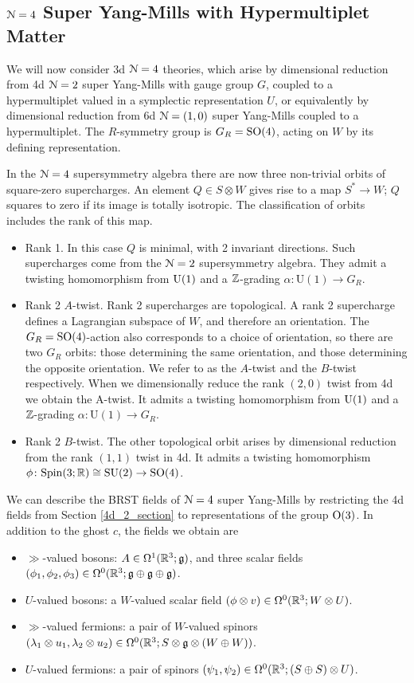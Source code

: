 \documentclass[10pt, oneside]{article}
\renewcommand{\U}{\mathrm{U}}
\begin{document}
\subsection{\texorpdfstring{$\mathcal N = 4$}{N=4} Super Yang-Mills with Hypermultiplet Matter} \label{3d_4_section}
We will now consider 3d $\mathcal{N}=4$ theories, which arise by dimensional reduction from 4d $\mathcal{N}=2$ super Yang-Mills with gauge group $G$, coupled to a hypermultiplet valued in a symplectic representation $U$, or equivalently by dimensional reduction from 6d $\mathcal{N}=(1,0)$ super Yang-Mills coupled to a hypermultiplet.  The $R$-symmetry group is $G_R = \mathrm{SO}(4)$, acting on $W$ by its defining representation.

In the $\mathcal{N}=4$ supersymmetry algebra there are now three non-trivial orbits of square-zero supercharges.  An element $Q \in S \otimes W$ gives rise to a map $S^* \to W$; $Q$ squares to zero if its image is totally isotropic.  The classification of orbits includes the rank of this map.
\begin{itemize}
 \item Rank 1.  In this case $Q$ is minimal, with 2 invariant directions.  Such supercharges come from the $\mathcal{N}=2$ supersymmetry algebra.  They admit a twisting homomorphism from $\mathrm{U}(1)$ and a $\mathbb Z$-grading $\alpha \colon \U(1) \to G_R$.
 \item Rank 2 $A$-twist.  Rank 2 supercharges are topological.  A rank 2 supercharge defines a Lagrangian subspace of $W$, and therefore an orientation.  The $G_R = \mathrm{SO}(4)$-action also corresponds to a choice of orientation, so there are two $G_R$ orbits: those determining the same orientation, and those determining the opposite orientation.  We refer to as the $A$-twist and the $B$-twist respectively.  When we dimensionally reduce the rank $(2,0)$ twist from 4d we obtain the A-twist.  It admits a twisting homomorphism from $\mathrm{U}(1)$ and a $\mathbb Z$-grading $\alpha \colon \U(1) \to G_R$.
 \item Rank 2 $B$-twist.  The other topological orbit arises by dimensional reduction from the rank $(1,1)$ twist in 4d.  It admits a twisting homomorphism $\phi \colon \mathrm{Spin}(3;\mathbb R) \cong \mathrm{SU}(2) \to \mathrm{SO}(4)$. 
\end{itemize}

We can describe the BRST fields of $\mathcal{N}=4$ super Yang-Mills by restricting the 4d fields from Section \ref{4d_2_section} to representations of the group $\mathrm{O}(3)$.  In addition to the ghost $c$, the fields we obtain are
\begin{itemize}
 \item $\gg$-valued bosons: $A \in \Omega^1(\mathbb R^3; \mathfrak{g})$, and three scalar fields $(\phi_1,\phi_2,\phi_3) \in \Omega^0(\mathbb R^3; \mathfrak{g} \oplus \mathfrak{g} \oplus \mathfrak{g})$.
 \item $U$-valued bosons: a $W$-valued scalar field $(\phi \otimes v) \in \Omega^0(\mathbb R^3; W \otimes U)$.
 \item $\gg$-valued fermions: a pair of $W$-valued spinors $(\lambda_1 \otimes u_1, \lambda_2 \otimes u_2) \in \Omega^0(\mathbb R^3 ; S \otimes \mathfrak{g} \otimes (W \oplus W))$.
 \item $U$-valued fermions:  a pair of spinors $(\psi_1,\psi_2) \in \Omega^0(\mathbb R^3; (S\oplus S) \otimes U)$.
\end{itemize}
\end{document}
